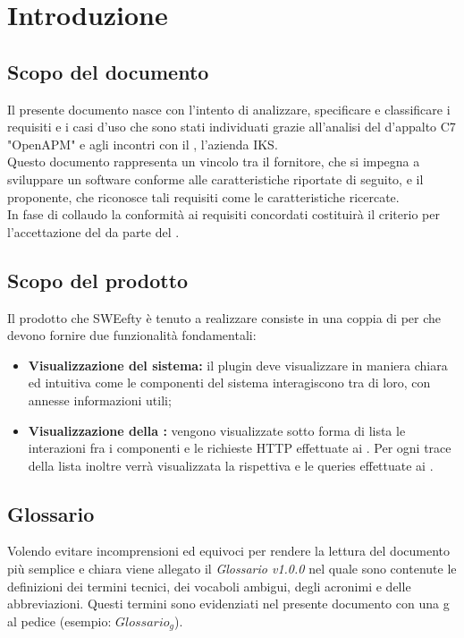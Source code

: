 \section{Introduzione}
	\subsection{Scopo del documento}
	Il presente documento nasce con l'intento di analizzare, specificare e classificare i requisiti e i casi d'uso che sono stati individuati grazie all'analisi del  d'appalto C7 "OpenAPM" e agli incontri con il , l'azienda IKS.\\
	Questo documento rappresenta un vincolo tra il fornitore, che si impegna a sviluppare un software conforme alle caratteristiche riportate di seguito, e il proponente, che riconosce tali requisiti come le caratteristiche ricercate.\\
	In fase di collaudo la conformità ai requisiti concordati costituirà il criterio per l'accettazione del  da parte del .

	\subsection{Scopo del prodotto}
	Il prodotto che SWEefty è tenuto a realizzare consiste in una coppia di  per  che devono fornire due funzionalità fondamentali:
	\begin{itemize}
		\item \textbf{Visualizzazione  del sistema:} il plugin deve visualizzare in maniera chiara ed intuitiva come le componenti del sistema interagiscono tra di loro, con annesse informazioni utili;
		\item \textbf{Visualizzazione della :} vengono visualizzate sotto forma di lista le interazioni fra i componenti e le richieste HTTP effettuate ai . Per ogni trace della lista inoltre verrà visualizzata la rispettiva  e le queries effettuate ai .
	\end{itemize}

	\subsection{Glossario}
		Volendo evitare incomprensioni  ed equivoci per rendere la lettura del documento più semplice e chiara viene allegato il \emph{Glossario v1.0.0} nel quale sono contenute le definizioni dei termini tecnici, dei vocaboli ambigui, degli acronimi e delle abbreviazioni. Questi termini sono evidenziati nel presente documento con una g al pedice (esempio: $Glossario_{g}$).

